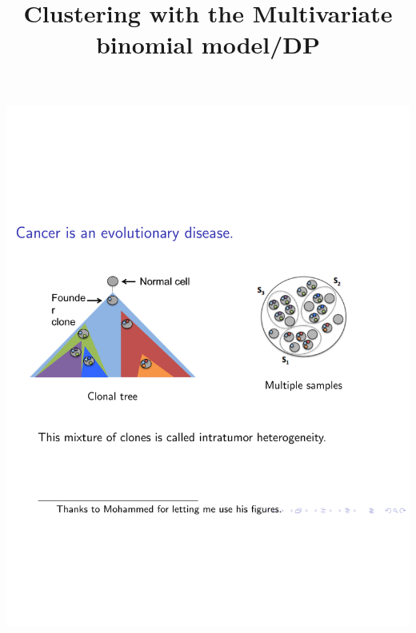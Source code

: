 \documentclass{beamer}
\title{Clustering with the Multivariate binomial model/DP}
\begin{document}
\begin{frame}
\titlepage
\end{frame}




\begin{frame}
\vspace*{-3.5cm}
\hspace*{-1.17cm}
\includegraphics[page=1, width=\paperwidth]{DDL-UTRA-2016-intro.pdf}
\end{frame}
\end{document}
